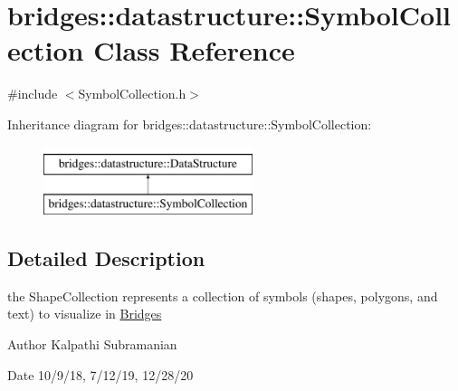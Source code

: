 \hypertarget{classbridges_1_1datastructure_1_1_symbol_collection}{}\section{bridges\+:\+:datastructure\+:\+:Symbol\+Collection Class Reference}
\label{classbridges_1_1datastructure_1_1_symbol_collection}


{\ttfamily \#include $<$Symbol\+Collection.\+h$>$}

Inheritance diagram for bridges\+:\+:datastructure\+:\+:Symbol\+Collection\+:\begin{figure}[H]
\begin{center}
\leavevmode
\includegraphics[height=2.000000cm]{classbridges_1_1datastructure_1_1_symbol_collection}
\end{center}
\end{figure}


\subsection{Detailed Description}
the Shape\+Collection represents a collection of symbols (shapes, polygons, and text) to visualize in \hyperlink{classbridges_1_1_bridges}{Bridges} 

\begin{DoxyAuthor}{Author}
Kalpathi Subramanian 
\end{DoxyAuthor}
\begin{DoxyDate}{Date}
10/9/18, 7/12/19, 12/28/20 
\end{DoxyDate}
